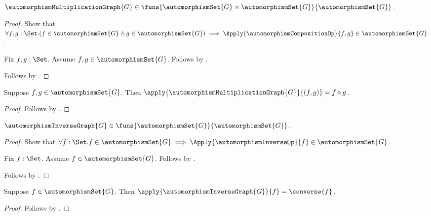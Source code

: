 \begin{proposition}\label{automorphism_multiplication_graph_type}
    $\automorphismMultiplicationGraph{G}\in
        \funs{
            \automorphismSet{G}\times\automorphismSet{G}}
            {\automorphismSet{G}}$.
\end{proposition}
\begin{proof}
    Show that $\forall f,g:\Set.
        (f\in\automorphismSet{G}\land g\in\automorphismSet{G})
        \implies
        \Apply{\automorphismCompositionOp}{f,g}
            \in\automorphismSet{G}$.
    \begin{subproof}
        Fix $f,g:\Set$.
        Assume $f,g\in\automorphismSet{G}$.
        Follows by
            .
    \end{subproof}
    Follows by
        .
\end{proof}

\begin{proposition}\label{automorphism_multiplication_graph_apply}
    Suppose $f,g\in\automorphismSet{G}$.
    Then $\apply{\automorphismMultiplicationGraph{G}}{(f,g)}=f\circ g$.
\end{proposition}
\begin{proof}
    Follows by
        .
\end{proof}

\begin{proposition}\label{automorphism_inverse_graph_type}
    $\automorphismInverseGraph{G}\in
        \funs{\automorphismSet{G}}{\automorphismSet{G}}$.
\end{proposition}
\begin{proof}
    Show that $\forall f:\Set.
        f\in\automorphismSet{G}\implies
        \Apply{\automorphismInverseOp}{f}\in\automorphismSet{G}$.
    \begin{subproof}
        Fix $f:\Set$.
        Assume $f\in\automorphismSet{G}$.
        Follows by
            .
    \end{subproof}
    Follows by
        .
\end{proof}

\begin{proposition}\label{automorphism_inverse_graph_apply}
    Suppose $f\in\automorphismSet{G}$.
    Then $\apply{\automorphismInverseGraph{G}}{f}=\converse{f}$.
\end{proposition}
\begin{proof}
    Follows by
        .
\end{proof}

